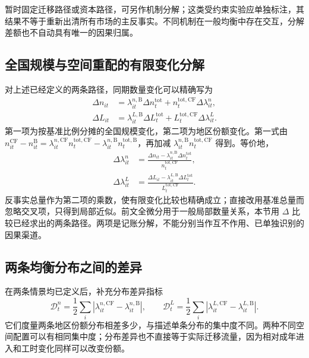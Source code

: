 \documentclass[UTF8,a4paper,zihao=-4,fontset=windows]{ctexart}
\numberwithin{equation}{section}
\begin{document}
暂时固定迁移路径或资本路径，可另作机制分解；这类受约束实验应单独标注，其结果不等于重新出清所有市场的主反事实。不同机制在一般均衡中存在交互，分解差额也不自动具有唯一的因果归属。

\subsection{全国规模与空间重配的有限变化分解}
对上述已经定义的两条路径，同期数量变化可以精确写为
\begin{align}
 \Delta n_{it}&=\lambda^{n,\mathrm B}_{it}\Delta n_t^{\mathrm{tot}}
 +n_t^{\mathrm{tot,CF}}\Delta\lambda^n_{it},\\
 \Delta L_{it}&=\lambda^{L,\mathrm B}_{it}\Delta L_t^{\mathrm{tot}}
 +L_t^{\mathrm{tot,CF}}\Delta\lambda^L_{it}.
 \label{eq:lg-scale-distribution-decomposition}
\end{align}
第一项为按基准比例分摊的全国规模变化，第二项为地区份额变化。第一式由 $n^{\mathrm{CF}}_{it}-n^{\mathrm B}_{it}=\lambda^{n,\mathrm{CF}}_{it}n_t^{\mathrm{tot,CF}}-\lambda^{n,\mathrm B}_{it}n_t^{\mathrm{tot,B}}$，再加减 $\lambda^{n,\mathrm B}_{it}n_t^{\mathrm{tot,CF}}$ 得到。等价地，
\begin{align}
 \Delta\lambda^n_{it}&=\frac{\Delta n_{it}-\lambda^{n,\mathrm B}_{it}\Delta n_t^{\mathrm{tot}}}{n_t^{\mathrm{tot,CF}}},\\
 \Delta\lambda^L_{it}&=\frac{\Delta L_{it}-\lambda^{L,\mathrm B}_{it}\Delta L_t^{\mathrm{tot}}}{L_t^{\mathrm{tot,CF}}}.
 \label{eq:lg-finite-share-change}
\end{align}
反事实总量作为第二项的乘数，使有限变化比较也精确成立；直接改用基准总量而忽略交叉项，只得到局部近似。前文全微分用于一般局部数量关系，本节用 $\Delta$ 比较已经求出的两条路径。两项是记账分解，不能分别当作互不作用、已单独识别的因果渠道。

\subsection{两条均衡分布之间的差异}
在两条情景均已定义后，补充分布差异指标
\begin{equation}
 \mathcal D^n_t=\frac12\sum_i|\lambda^{n,\mathrm{CF}}_{it}-\lambda^{n,\mathrm B}_{it}|,\qquad
 \mathcal D^L_t=\frac12\sum_i|\lambda^{L,\mathrm{CF}}_{it}-\lambda^{L,\mathrm B}_{it}|.
 \label{eq:lg-distribution-distance}
\end{equation}
它们度量两条地区份额分布相差多少，与描述单条分布的集中度不同。两种不同空间配置可以有相同集中度；分布差异也不直接等于实际迁移流量，因为相对成年进入和工时变化同样可以改变份额。
\end{document}

